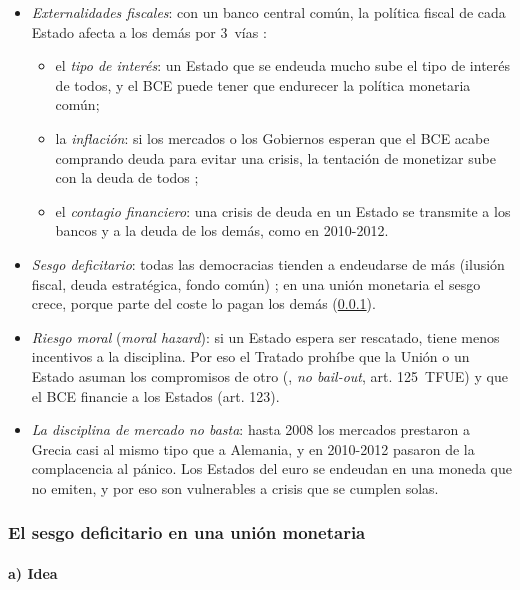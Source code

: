 \documentclass[11pt]{article}
\begin{document}
\begin{itemize}
\item \emph{Externalidades fiscales}: con un banco central común, la política fiscal de cada Estado afecta a los demás por 3~vías :
  \begin{itemize}
  \item el \emph{tipo de interés}: un Estado que se endeuda mucho sube el tipo de interés de todos, y el BCE puede tener que endurecer la política monetaria común;
  \item la \emph{inflación}: si los mercados o los Gobiernos esperan que el BCE acabe comprando deuda para evitar una crisis, la tentación de monetizar sube con la deuda de todos ;
  \item el \emph{contagio financiero}: una crisis de deuda en un Estado se transmite a los bancos y a la deuda de los demás, como en 2010-2012.
  \end{itemize}
\item \emph{Sesgo deficitario}: todas las democracias tienden a endeudarse de más (ilusión fiscal, deuda estratégica, fondo común) ; en una unión monetaria el sesgo crece, porque parte del coste lo pagan los demás (\ref{sec:sesgo-union}).
\item \emph{Riesgo moral} (\emph{moral hazard}): si un Estado espera ser rescatado, tiene menos incentivos a la disciplina. Por eso el Tratado prohíbe que la Unión o un Estado asuman los compromisos de otro (, \emph{no bail-out}, art. 125~TFUE) y que el BCE financie a los Estados (art. 123)\nocite{UE2016TFUE}.
\item \emph{La disciplina de mercado no basta}: hasta 2008 los mercados prestaron a Grecia casi al mismo tipo que a Alemania, y en 2010-2012 pasaron de la complacencia al pánico. Los Estados del euro se endeudan en una moneda que no emiten, y por eso son vulnerables a crisis que se cumplen solas\nocite{DeGrauwe2011Governance}.
\end{itemize}

\subsubsection{El sesgo deficitario en una unión monetaria}\label{sec:sesgo-union}

\paragraph{a) Idea}
\end{document}
